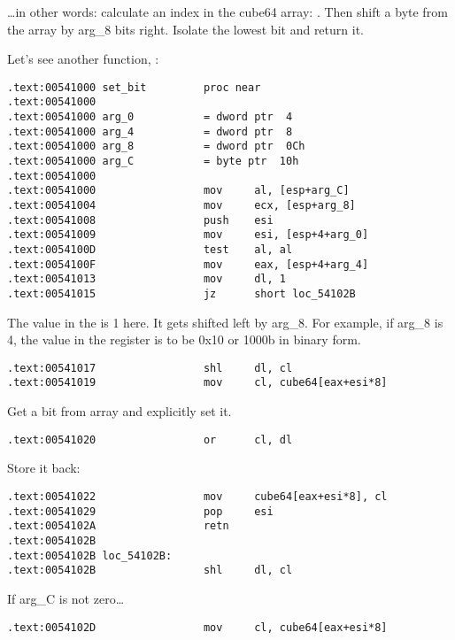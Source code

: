 \dots in other words: calculate an index in 
the cube64 array: .
Then shift a byte from the array by arg\_8 bits right. 
Isolate the lowest bit and return it.

Let's see another function, :

\begin{lstlisting}[style=customasmx86]
.text:00541000 set_bit         proc near
.text:00541000
.text:00541000 arg_0           = dword ptr  4
.text:00541000 arg_4           = dword ptr  8
.text:00541000 arg_8           = dword ptr  0Ch
.text:00541000 arg_C           = byte ptr  10h
.text:00541000
.text:00541000                 mov     al, [esp+arg_C]
.text:00541004                 mov     ecx, [esp+arg_8]
.text:00541008                 push    esi
.text:00541009                 mov     esi, [esp+4+arg_0]
.text:0054100D                 test    al, al
.text:0054100F                 mov     eax, [esp+4+arg_4]
.text:00541013                 mov     dl, 1
.text:00541015                 jz      short loc_54102B
\end{lstlisting}

The value in the  is 1 here. It gets shifted left by arg\_8.
For example, if arg\_8 is 4, the value in the  register is to be 
0x10 or 1000b in binary form.

\begin{lstlisting}[style=customasmx86]
.text:00541017                 shl     dl, cl
.text:00541019                 mov     cl, cube64[eax+esi*8]
\end{lstlisting}

Get a bit from array and explicitly set it. %

\begin{lstlisting}[style=customasmx86]
.text:00541020                 or      cl, dl
\end{lstlisting}

Store it back: %

\begin{lstlisting}[style=customasmx86]
.text:00541022                 mov     cube64[eax+esi*8], cl
.text:00541029                 pop     esi
.text:0054102A                 retn
.text:0054102B
.text:0054102B loc_54102B:
.text:0054102B                 shl     dl, cl
\end{lstlisting}

If arg\_C is not zero\dots

\begin{lstlisting}[style=customasmx86]
.text:0054102D                 mov     cl, cube64[eax+esi*8]
\end{lstlisting}

